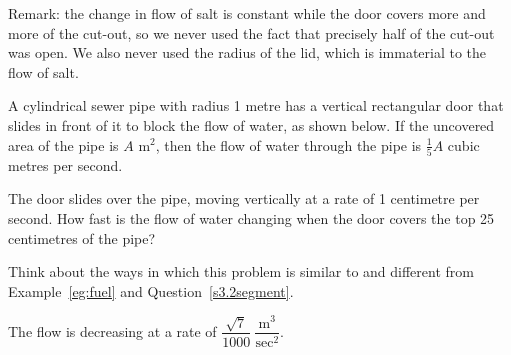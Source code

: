 \begin{solution}
Remark: the change in flow of salt is constant while the door covers more and more of the cut-out, so we never used the fact that precisely half of the cut-out was open. We also never used the radius of the lid, which is immaterial to the flow of salt.
\end{solution}


\begin{Mquestion}
A cylindrical sewer pipe with radius 1 metre has a vertical rectangular door that slides  in front of it to block the flow of water, as shown below. If the uncovered area of the pipe is $A$ m$^2$, then the flow of water through the pipe is $\frac{1}{5}A$ cubic metres per second.

The door slides over the pipe, moving vertically at a rate of 1 centimetre per second. How fast is the flow of water changing when the door covers the top 25 centimetres of the pipe?

\begin{center}\end{center}
\end{Mquestion}
\begin{hint}
Think about the ways in which this problem is similar to and different from
Example~\ref*{eg:fuel}
and Question~\ref{s3.2segment}.
\end{hint}
\begin{answer}
The flow is decreasing at a rate of $\dfrac{\sqrt{7}}{1000}~\dfrac{\mathrm{m}^3}{\mathrm{sec}^2}$.
\end{answer}
